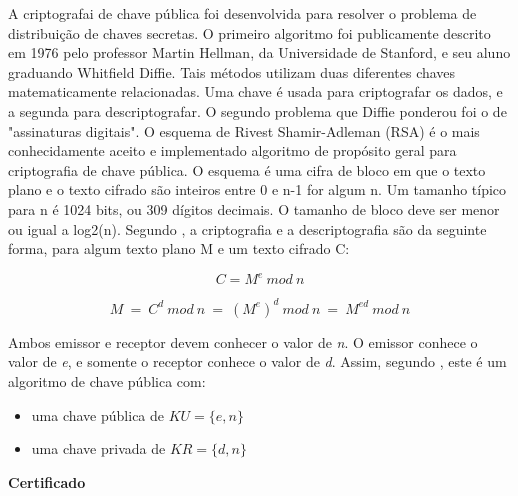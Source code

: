 A criptografai de chave pública foi desenvolvida para resolver o problema de distribuição de chaves secretas. O primeiro algoritmo foi publicamente descrito em 1976 pelo professor Martin Hellman, da Universidade de Stanford, e seu aluno graduando Whitfield Diffie. Tais métodos utilizam duas diferentes chaves matematicamente relacionadas. Uma chave é usada para criptografar os dados, e a segunda para descriptografar. O segundo problema que Diffie ponderou foi o de "assinaturas digitais". O esquema de Rivest Shamir-Adleman (RSA) é o mais conhecidamente aceito e implementado algoritmo de propósito geral para criptografia de chave pública. O esquema é uma cifra de bloco em que o texto plano e o texto cifrado são inteiros entre 0 e n-1 for algum n. Um tamanho típico para n é 1024 bits, ou 309 dígitos decimais. O tamanho de bloco deve ser menor ou igual a log2(n). Segundo \cite{al2008commerce}, a criptografia e a descriptografia são da seguinte forma, para algum texto plano M e um texto cifrado C:
\begin{center}
	\begin{equation}
		C=M^e\:mod\:n%
	\end{equation}
	\label{eq:rsa-cifragem}
\end{center}

\begin{center}
	\begin{equation}
		M \: = \: C^d \: mod \: n \: = \: (M^e)^d \: mod \: n \: = \: M^{ed} \: mod \: n 
	\end{equation}
	\label{eq:rsa-decifragem}
\end{center}

Ambos emissor e receptor devem conhecer o valor de \textit{n}. O emissor conhece o valor de \textit{e}, e somente o receptor conhece o valor de \textit{d}. Assim, segundo \cite{al2008commerce}, este é um algoritmo de chave pública com:
\begin{itemize}
	\item uma chave pública de $ KU=\{e,n\} $
	\item uma chave privada de $ KR=\{d,n\} $
\end{itemize}

\textbf{Certificado}

